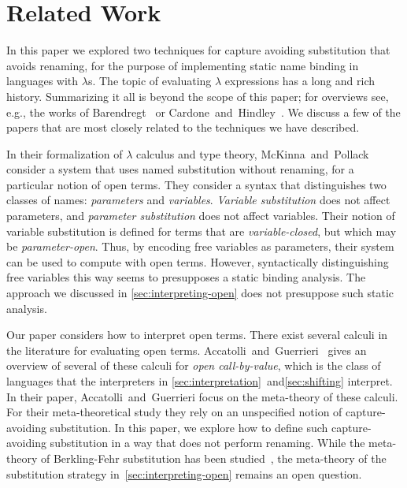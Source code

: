 \section{Related Work}
\label{sec:related}

In this paper we explored two techniques for capture avoiding substitution that avoids renaming, for the purpose of implementing static name binding in languages with $\lambda$s.
The topic of evaluating $\lambda$ expressions has a long and rich history.
Summarizing it all is beyond the scope of this paper; for overviews see, e.g., the works of Barendregt~\cite{DBLP:journals/bsl/Barendregt97} or Cardone~and~Hindley~\cite{hindley-lambda-history}.
We discuss a few of the papers that are most closely related to the techniques we have described.

In their formalization of $\lambda$ calculus and type theory, McKinna~and~Pollack~\cite{DBLP:journals/jar/McKinnaP99} consider a system that uses named substitution without renaming, for a particular notion of open terms.
They consider a syntax that distinguishes two classes of names: \emph{parameters} and \emph{variables}.
\emph{Variable substitution} does not affect parameters, and \emph{parameter substitution} does not affect variables.
Their notion of variable substitution is defined for terms that are \emph{variable-closed}, but which may be \emph{parameter-open}.
Thus, by encoding free variables as parameters, their system can be used to compute with open terms.
However, syntactically distinguishing free variables this way seems to presupposes a static binding analysis.
The approach we discussed in \cref{sec:interpreting-open} does not presuppose such static analysis.

Our paper considers how to interpret open terms.
There exist several calculi in the literature for evaluating open terms.
Accatolli~and~Guerrieri~\cite{DBLP:conf/aplas/AccattoliG16} gives an overview of several of these calculi for \emph{open call-by-value}, which is the class of languages that the interpreters in \cref{sec:interpretation}~and\cref{sec:shifting} interpret.
In their paper, Accatolli~and~Guerrieri focus on the meta-theory of these calculi.
For their meta-theoretical study they rely on an unspecified notion of capture-avoiding substitution.
In this paper, we explore how to define such capture-avoiding substitution in a way that does not perform renaming.
While the meta-theory of Berkling-Fehr substitution has been studied~\cite{berkling1982amodification}, the meta-theory of the substitution strategy in~\cref{sec:interpreting-open} remains an open question.

